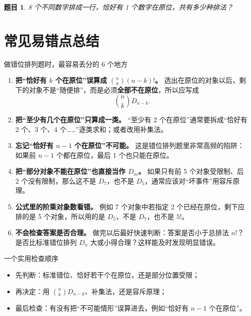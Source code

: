 \documentclass[11pt,a4paper,fontset=fandol]{ctexart}
\theoremstyle{formalexample}
\newtheorem{exercise}{题目}[section]
\begin{document}
\begin{exercise}
8 个不同数字排成一行，恰好有 1 个数字在原位，共有多少种排法？
\end{exercise}

\newpage
\section{常见易错点总结}

\begin{goalbox}{做错位排列题时，最容易丢分的 6 个地方}
\begin{enumerate}
  \item \textbf{把“恰好有 $k$ 个在原位”误算成 $\binom{n}{k}(n-k)!$。}  
  选出在原位的对象以后，剩下的对象不是“随便排”，而是必须\textbf{全部不在原位}，所以应写成
  \[
  \binom{n}{k}D_{n-k}.
  \]

  \item \textbf{把“至少有几个在原位”只算成一类。}  
  “至少有 2 个在原位”通常要拆成“恰好有 2 个、3 个、4 个……”逐类求和；或者改用补集法。

  \item \textbf{忘记“恰好有 $n-1$ 个在原位”不可能。}  
  这是错位排列题里非常高频的陷阱：如果前 $n-1$ 个都在原位，最后 1 个也只能在原位。

  \item \textbf{把“部分对象不能在原位”也直接当作 $D_m$。}  
  如果只有前 5 个对象受限制、后 2 个没有限制，那么这不是 $D_7$，也不是 $D_5$，通常应该对“坏事件”用容斥原理。

  \item \textbf{公式里的阶乘对象数看错。}  
  例如 7 个对象中若指定 2 个已经在原位，剩下应排的是 5 个对象，所以用的是 $D_5$，不是 $D_7$，也不是 $5!$。

  \item \textbf{不会检查答案是否合理。}  
  做完以后最好快速判断：答案是否小于总排法 $n!$？是否比标准错位排列 $D_n$ 大或小得合理？这样能及时发现明显错误。
\end{enumerate}
\end{goalbox}

\begin{notebox}{一个实用检查顺序}
\begin{itemize}
  \item 先判断：标准错位、恰好若干个在原位，还是部分位置受限；
  \item 再决定：用 $\binom{n}{k}D_{n-k}$、补集法，还是容斥原理；
  \item 最后检查：有没有把“不可能情形”误算进去，例如“恰好有 $n-1$ 个在原位”。
\end{itemize}
\end{notebox}
\end{document}
